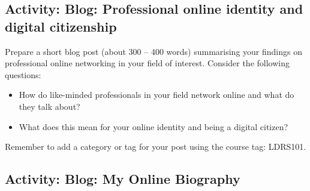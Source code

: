 \documentclass[
]{book}
\providecommand{\tightlist}{%
  \setlength{\itemsep}{0pt}\setlength{\parskip}{0pt}}
\theoremstyle{definition}
\theoremstyle{definition}
\theoremstyle{definition}
\theoremstyle{definition}
\theoremstyle{remark}
\begin{document}
\hypertarget{activity-blog-professional-online-identity-and-digital-citizenship}{%
\subsection*{Activity: Blog: Professional online identity and digital citizenship}\label{activity-blog-professional-online-identity-and-digital-citizenship}}

\begin{reflect}
Prepare a short blog post (about 300 -- 400 words) summarising your findings on professional online networking in your field of interest. Consider the following questions:

\begin{itemize}
\tightlist
\item
  How do like-minded professionals in your field network online and what do they talk about?\\
\item
  What does this mean for your online identity and being a digital citizen?
\end{itemize}

Remember to add a category or tag for your post using the course tag: LDRS101.
\end{reflect}

\hypertarget{activity-blog-my-online-biography}{%
\subsection*{Activity: Blog: My Online Biography}\label{activity-blog-my-online-biography}}
\end{document}
